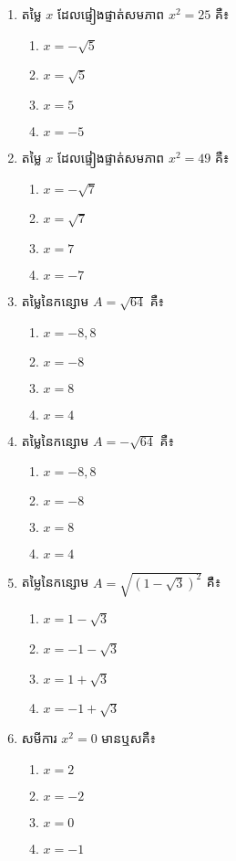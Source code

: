 \begin{enumerate}
\item តម្លៃ $x$ ដែលផ្ទៀងផ្ទាត់សមភាព $x^2=25$ គឺ៖
\begin{enumerate}[k,4]
	\item $x=-\sqrt{5}$
	\item $x=\sqrt{5}$
	\item $x=5$
	\item $x=-5$
\end{enumerate}

\item តម្លៃ $x$ ដែលផ្ទៀងផ្ទាត់សមភាព $x^2=49$ គឺ៖
\begin{enumerate}[k,4]
	\item $x=-\sqrt{7}$
	\item $x=\sqrt{7}$
	\item $x=7$
	\item $x=-7$
\end{enumerate}

\item តម្លៃនៃកន្សោម $A=\sqrt{64}$  គឺ៖
\begin{enumerate}[k,4]
	\item $x=-8,8$
	\item $x=-8$
	\item $x=8$
	\item $x=4$
\end{enumerate}

\item តម្លៃនៃកន្សោម $A=-\sqrt{64}$  គឺ៖
\begin{enumerate}[k,4]
	\item $x=-8,8$
	\item $x=-8$
	\item $x=8$
	\item $x=4$
\end{enumerate}

\item តម្លៃនៃកន្សោម $A=\sqrt{\left(1-\sqrt{3}\right)^2}$  គឺ៖
\begin{enumerate}[k,4]
	\item $x=1-\sqrt{3}$
	\item $x=-1-\sqrt{3}$
	\item $x=1+\sqrt{3}$
	\item $x=-1+\sqrt{3}$
\end{enumerate}

\item សមីការ $x^2=0$ មានឬសគឺ៖
\begin{enumerate}[k,4]
	\item $x=2$
	\item $x=-2$
	\item $x=0$
	\item $x=-1$
\end{enumerate}


\end{enumerate}
